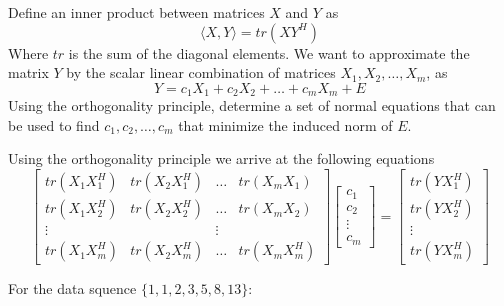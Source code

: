 \documentclass{homework}
\begin{document}
\begin{problem}[3-10]
Define an inner product between matrices $X$ and $Y$ as 
\[\langle X, Y\rangle = tr(XY^H)\]
Where $tr$ is the sum of the diagonal elements. We want to approximate the matrix $Y$ by the scalar linear combination of matrices $X_1, X_2, \dots, X_m$, as
\[ Y = c_1X_1 + c_2X_2 + \dots + c_mX_m + E\]
Using the orthogonality principle, determine a set of normal equations that can be used to find $c_1, c_2, \dots, c_m$ that minimize the induced norm of $E$.
\end{problem}

\begin{solution}
  Using the orthogonality principle we arrive at the following equations
  $$
  \begin{bmatrix}
    tr(X_1X_1^H) & tr(X_2X_1^H) & \dots & tr(X_mX_1) \\ 
    tr(X_1X_2^H) & tr(X_2X_2^H) & \dots & tr(X_mX_2) \\ 
    \vdots & & \vdots \\
    tr(X_1X_m^H) & tr(X_2X_m^H) & \dots & tr(X_mX_m^H)
  \end{bmatrix}
  \begin{bmatrix}
   c_1 \\
   c_2 \\
   \vdots \\
   c_m
  \end{bmatrix}
  =
  \begin{bmatrix}
    tr(YX_1^H) \\
    tr(YX_2^H) \\
    \vdots \\
    tr(YX_m^H) 
  \end{bmatrix}
  $$
\end{solution}

\begin{problem}[3-12]
  For the data squence $\{1, 1, 2, 3, 5, 8, 13\}$:
\end{problem}
\end{document}
